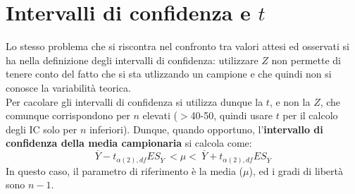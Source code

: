 \documentclass[10pt, draft]{book}
\begin{document}
\section{Intervalli di confidenza e \texorpdfstring{$t$}{Lg}}
Lo stesso problema che si riscontra nel confronto tra valori attesi ed osservati si ha nella definizione degli intervalli di confidenza: utilizzare $Z$ non permette di tenere conto del fatto che si sta utlizzando un campione e che quindi non si conosce la variabilità teorica.
\\
Per cacolare gli intervalli di confidenza si utilizza dunque la $t$, e non la $Z$, che comunque corrispondono per $n$ elevati ($>$40-50, quindi usare $t$ per il calcolo degli IC solo per $n$ inferiori). Dunque, quando opportuno, l'\textbf{intervallo di confidenza della media campionaria} si calcola come:
\begin{equation}
    \overline{Y}-t_{\alpha(2),df}ES_{\overline{Y}}\ < \mu <\ \overline{Y}+t_{\alpha(2),df}ES_{\overline{Y}} 
\end{equation}
In questo caso, il parametro di riferimento è la media ($\mu$), ed i gradi di libertà sono $n-1$.
\end{document}
